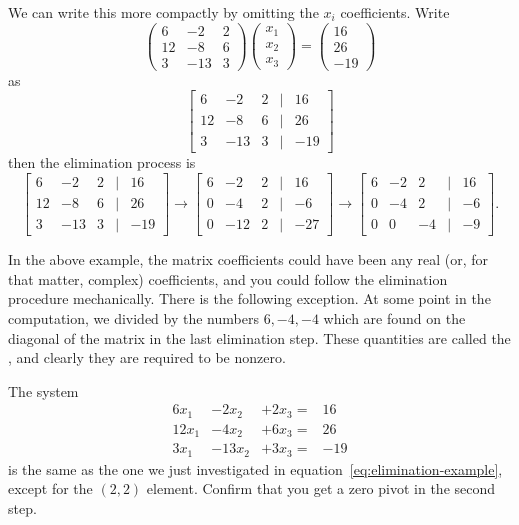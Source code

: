 We can write this more compactly by omitting the $x_i$ coefficients. Write
\[ 
\begin{pmatrix}
  6&-2&2\\ 12&-8&6\\ 3&-13&3
\end{pmatrix}
\begin{pmatrix} x_1\\ x_2\\ x_3 \end{pmatrix}
=
\begin{pmatrix}
  16\\ 26\\ -19
\end{pmatrix}
\]
as
\begin{equation}
\left[
  \begin{matrix}
    6&-2&2&|&16\\ 12&-8&6&|&26\\ 3&-13&3&|&-19      
  \end{matrix}\right]
\label{eq:systemabbrev}
\end{equation}
then the elimination process is
\[
\left[
  \begin{matrix}
    6&-2&2&|&16\\ 12&-8&6&|&26\\ 3&-13&3&|&-19      
  \end{matrix}\right] \longrightarrow
\left[
    \begin{matrix}
      6&-2&2&|&16\\ 0&-4&2&|&-6\\ 0&-12&2&|&-27
    \end{matrix}\right] \longrightarrow
  \left[
    \begin{matrix}
      6&-2&2&|&16\\ 0&-4&2&|&-6\\ 0&0&-4&|&-9
    \end{matrix}\right].
\]

In the above example, the matrix coefficients could have been any real
(or, for that matter, complex) coefficients, and you could follow the
elimination procedure mechanically.
There is  the following exception.
At some point in the computation, we divided by the numbers
$6,-4,-4$ which are found on the diagonal of the matrix in the last
elimination step. These quantities are called the ,
and clearly they are required to be nonzero. 

\begin{exercise}
  \label{ex:zero-pivot}
  The system 
  \[
  \begin{array}{rrrr}
    6x_1&-2x_2&+2x_3=&16 \\ 12x_1&-4x_2&+6x_3=&26 \\ 3x_1&-13x_2&+3x_3=&-19
  \end{array}
  \]
  is the same as the one we just investigated in
  equation~\eqref{eq:elimination-example}, except for the $(2,2)$
  element. Confirm that you get a zero pivot in the second step.
\end{exercise}


